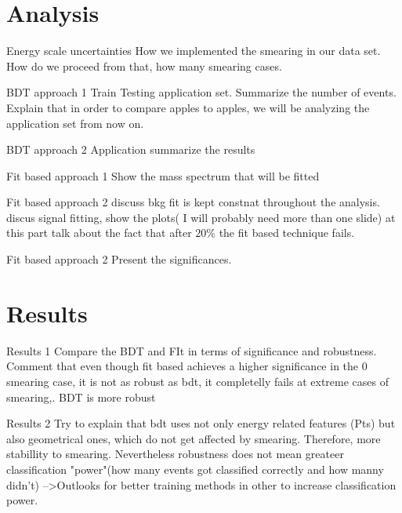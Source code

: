 \documentclass[bigger]{beamer}
\begin{document}
\section{Analysis}
\label{sec:org79e0348}
\begin{frame}[label={sec:org6cea401}]{Energy scale uncertainties}
How we implemented the smearing in our data set. How do we proceed from that, how many smearing cases. 
\end{frame}
\begin{frame}[label={sec:orgb5cf40e}]{BDT approach 1}
Train Testing application set. Summarize the number of events. Explain that in order to compare apples to apples, we will be analyzing the application set from now on.
\end{frame}
\begin{frame}[label={sec:org5ecd5bc}]{BDT approach 2}
Application summarize the results 
\end{frame}
\begin{frame}[label={sec:org8ceef57}]{Fit based approach 1}
Show the mass spectrum that will be fitted 
\end{frame}
\begin{frame}[label={sec:org9dd050f}]{Fit based approach 2}
discuss bkg fit is kept constnat throughout the analysis. discus signal fitting, show the plots( I will probably need more than one slide) at this part talk about the fact that after \(20\%\) the fit based technique fails. 
\end{frame}
\begin{frame}[label={sec:org70f5d61}]{Fit based approach 2}
Present the significances.
\end{frame}
\section{Results}
\label{sec:org98cca42}
\begin{frame}[label={sec:orgd65246a}]{Results 1}
Compare the BDT and FIt in terms of significance and robustness. Comment that even though fit based achieves a higher significance in the 0 smearing case, it is not as robust as bdt, it completelly fails at extreme cases of smearing,. BDT is more robust 
\end{frame}
\begin{frame}[label={sec:orgab847b6}]{Results 2}
Try to explain that bdt uses not only energy related features (Pts) but also geometrical ones, which do not get affected by smearing. Therefore, more stabillity to smearing. Nevertheless robustness does not mean greateer classification "power"(how many events got classified correctly and how manny didn't) -->Outlooks for better training methods in other to increase classification power.   
\end{frame}
\end{document}
